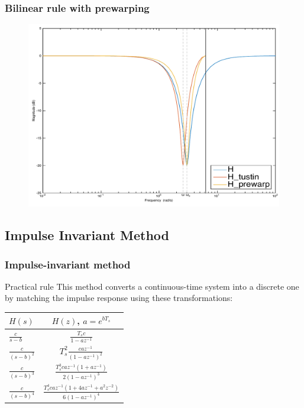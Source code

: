 \begin{frame}
	\frametitle{Bilinear rule with prewarping}
	\vspace{-0.5em}
	\begin{figure}
		\centering
		\includegraphics[width=0.8\linewidth]{Distortion_bode1}
	\end{figure}
\end{frame}

\subsection{Impulse Invariant Method}

\begin{frame}
	\frametitle{Impulse-invariant method}
	\begin{block}{Practical rule}
		This method converts a continuous-time system into a discrete one by matching the impulse response using these transformations:
		\vspace{-1em}
		\begin{center} 
			\begin{tabular}{ | l | c |} 
			\hline $H(s)$ & $H(z)$, $a = e^{bT_s}$\\ 
			\hline $\frac{c}{s - b}$ & $\frac{T_sc}{1 - az^{-1}}$\\ 
			\hline $\frac{c}{(s - b)^2}$ & $T_s^2 \frac{caz^{-1}}{(1 - az^{-1})^2}$ \\
			\hline $\frac{c}{(s - b)^3}$ & $\frac{T_s^3 caz^{-1}(1 + az^{-1})}{2(1 - az^{-1})^3}$ \\
			\hline $\frac{c}{(s - b)^4}$ & $\frac{T_s^4 caz^{-1}(1 + 4az^{-1} + a^2z^{-2})}{6(1 - az^{-1})^4}$ \\
			\hline 
			\end{tabular}
		\end{center}
	\end{block}
\end{frame}

